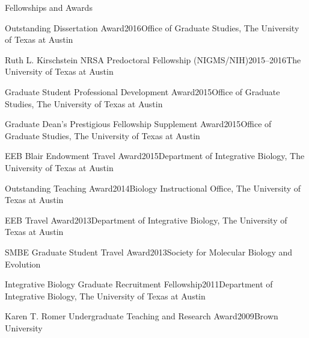 \documentclass{resume} %
\begin{document}
\vspace*{0.35cm}
\begin{rSection}{Fellowships and Awards}
\vspace*{0.25cm}

\begin{rSubsection}{Outstanding Dissertation Award}{2016}{Office of Graduate Studies, The University of Texas at Austin}{}
\end{rSubsection}

\begin{rSubsection}{Ruth L. Kirschstein NRSA Predoctoral Fellowship (NIGMS/NIH)}{2015--2016}{The University of Texas at Austin}
\end{rSubsection}

\begin{rSubsection}{Graduate Student Professional Development Award}{2015}{Office of Graduate Studies, The University of Texas at Austin}{}
\end{rSubsection}

\begin{rSubsection}{Graduate Dean's Prestigious Fellowship Supplement Award}{2015}{Office of Graduate Studies, The University of Texas at Austin}{}
\end{rSubsection}

\begin{rSubsection}{EEB Blair Endowment Travel Award}{2015}{Department of Integrative Biology, The University of Texas at Austin}{}
\end{rSubsection}

\begin{rSubsection}{Outstanding Teaching Award}{2014}{Biology Instructional Office, The University of Texas at Austin}{}
\end{rSubsection}

\begin{rSubsection}{EEB Travel Award}{2013}{Department of Integrative Biology, The University of Texas at Austin}{}
\end{rSubsection}

\begin{rSubsection}{SMBE Graduate Student Travel Award}{2013}{Society for Molecular Biology and Evolution}{}
\end{rSubsection}

\begin{rSubsection}{Integrative Biology Graduate Recruitment Fellowship}{2011}{Department of Integrative Biology, The University of Texas at Austin}{}
\end{rSubsection}

\begin{rSubsection}{Karen T. Romer Undergraduate Teaching and Research Award}{2009}{Brown University}{}
\end{rSubsection}


\end{rSection}
\end{document}
